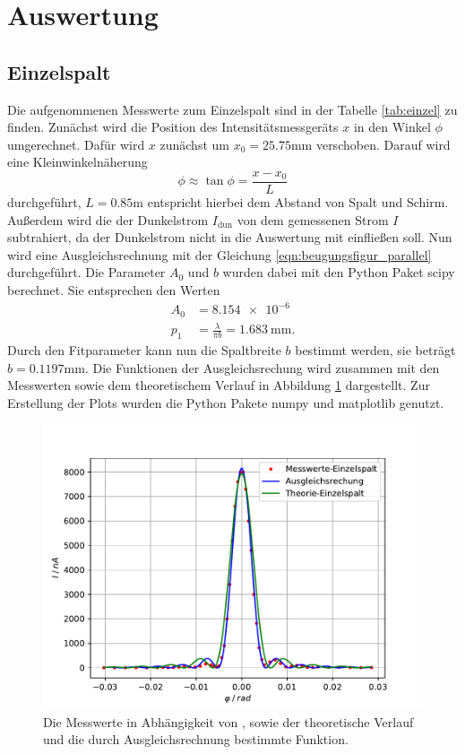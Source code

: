\section{Auswertung}
\label{sec:Auswertung}
\subsection{Einzelspalt}
Die aufgenommenen Messwerte zum Einzelspalt sind in der Tabelle \ref{tab:einzel} zu finden.
Zunächst wird die Position des Intensitätsmessgeräts $x$ in den Winkel $\phi$ umgerechnet.
Dafür wird $x$ zunächst um $x_0=  25.75\si{\milli\meter}$ verschoben.
Darauf wird eine Kleinwinkelnäherung
\begin{equation*}
    \phi \approx \tan{\phi} = \frac{x-x_0}{L}
\end{equation*}
durchgeführt, $L=0.85\si{\meter}$ entspricht hierbei dem Abstand von Spalt und Schirm.
Außerdem wird die der Dunkelstrom $I_\text{dun}$ von dem gemessenen Strom $I$ subtrahiert, da der Dunkelstrom nicht in die Auswertung mit einfließen soll.
Nun wird eine Ausgleichsrechnung mit der Gleichung \ref{eqn:beugungsfigur_parallel} durchgeführt.
Die Parameter $A_0$ und $b$ wurden dabei mit den Python Paket scipy \cite{scipy} berechnet.
Sie entsprechen den Werten
\begin{align*}
    A_0 &= \SI{8.154e-6}{}\\ 
    p_1 &= \frac{\lambda}{\pi b} = \SI{1.683}{\milli\meter}.
\end{align*}
Durch den Fitparameter kann nun die Spaltbreite $b$ bestimmt werden, sie beträgt $b = 0.1197 \si{\milli\meter}$.
Die Funktionen der Ausgleichsrechung wird zusammen mit den Messwerten sowie dem theoretischem Verlauf in Abbildung \ref{fig:einzel} dargestellt.
Zur Erstellung der Plots wurden die Python Pakete numpy \cite{numpy} und matplotlib \cite{matplotlib} genutzt.

\begin{figure}
    \centering
    \includegraphics[width=\textwidth]{content/data/einzelspalt.pdf}
    \caption{Die Messwerte in Abhängigkeit von \phi, sowie der theoretische Verlauf und die durch Ausgleichsrechnung bestimmte Funktion.}
    \label{fig:einzel}
\end{figure}


